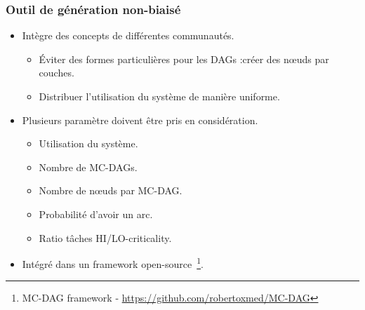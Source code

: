 \documentclass[xcolor=table]{beamer}
\begin{document}
\begin{frame}
	\frametitle{Outil de génération non-biaisé}		
	\begin{itemize}
		\item Intègre des concepts de différentes communautés.
		\begin{itemize}
			\item Éviter des formes particulières pour les DAGs :créer des n\oe{}uds par couches.
			\item Distribuer l'utilisation du système de manière uniforme.
		\end{itemize}
		\item Plusieurs paramètre doivent être pris en considération.
		\begin{itemize}
			\item Utilisation du système.
			\item Nombre de MC-DAGs.
			\item Nombre de n\oe{}uds par MC-DAG.
			\item Probabilité d'avoir un arc.
			\item Ratio tâches HI/LO-criticality.
		\end{itemize}
		\item Intégré dans un framework open-source~\footnote{MC-DAG 
			framework - \url{https://github.com/robertoxmed/MC-DAG}}.
	\end{itemize}
\end{frame}

\end{document}
